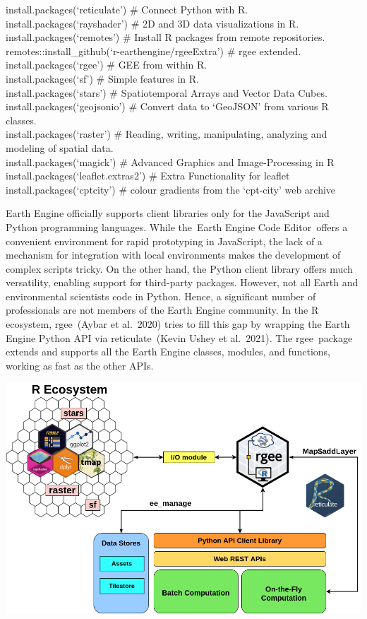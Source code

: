 \documentclass[
  letterpaper,
  DIV=11,
  numbers=noendperiod]{scrreprt}
\begin{document}
install.packages(`reticulate') \# Connect Python with R.\\
install.packages(`rayshader') \# 2D and 3D data visualizations in R.\\
install.packages(`remotes') \# Install R packages from remote
repositories.\\
remotes::install\_github(`r-earthengine/rgeeExtra') \# rgee extended.\\
install.packages(`rgee') \# GEE from within R.\\
install.packages(`sf') \# Simple features in R.\\
install.packages(`stars') \# Spatiotemporal Arrays and Vector Data
Cubes.\\
install.packages(`geojsonio') \# Convert data to `GeoJSON' from various
R classes.\\
install.packages(`raster') \# Reading, writing, manipulating, analyzing
and modeling of spatial data.\\
install.packages(`magick') \# Advanced Graphics and Image-Processing in
R\\
install.packages(`leaflet.extras2') \# Extra Functionality for leaflet\\
install.packages(`cptcity') \# colour gradients from the `cpt-city' web
archive

Earth Engine officially supports client libraries only for the
JavaScript and Python programming languages. While the~Earth Engine Code
Editor~offers a convenient environment for rapid prototyping in
JavaScript, the lack of a mechanism for integration with local
environments makes the development of complex scripts tricky. On the
other hand, the Python client library offers much versatility, enabling
support for third-party packages. However, not all Earth and
environmental scientists code in Python. Hence, a significant number of
professionals are not members of the Earth Engine community. In the R
ecosystem, rgee~(Aybar et al.~2020) tries to fill this gap by wrapping
the Earth Engine Python API via reticulate~(Kevin Ushey et al.~2021).
The rgee~package extends and supports all the Earth Engine classes,
modules, and functions, working as fast as the other APIs.

\includegraphics{./F6/image48.png}
\end{document}
